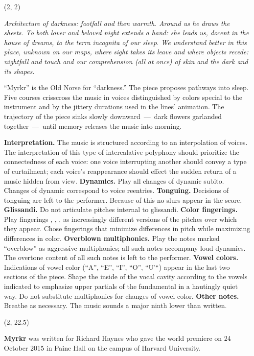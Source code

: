\documentclass[10pt]{article}
\begin{document}
\begin{textblock}{19}(2, 2)

\textit{Architecture of darkness: footfall and then warmth. Around us he draws
the sheets. To both lover and beloved night extends a hand: she leads us,
docent in the house of dreams, to the terra incognita of our sleep. We
understand better in this place, unknown on our maps, where sight takes its
leave and where objects recede: nightfall and touch and our comprehension (all
at once) of skin and the dark and its shapes.}

``Myrkr'' is the Old Norse for ``darkness.'' The piece proposes pathways into
sleep. Five courses crisscross the music in voices distinguished by colors
special to the instrument and by the jittery durations used in the lines'
animation. The trajectory of the piece sinks slowly downward~---~dark flowers
garlanded together~---~until memory releases the music into morning.

\textbf{Interpretation.} The music is structured according to an interpolation
of voices. The interpretation of this type of intercalative polyphony should
prioritize the connectedness of each voice: one voice interrupting another
should convey a type of curtailment; each voice's reappearance should effect
the sudden return of a music hidden from view. \textbf{Dynamics.} Play all
changes of dynamic subito. Changes of dynamic correspond to voice reentries.
\textbf{Tonguing.} Decisions of tonguing are left to the performer. Because of
this no slurs appear in the score. \textbf{Glissandi.} Do not articulate
pitches internal to glissandi. \textbf{Color fingerings.} Play fingerings
, , ,  as increasingly different
versions of the pitches over which they appear. Chose fingerings that minimize
differences in pitch while maximizing differences in color. \textbf{Overblown
multiphonics.} Play the notes marked ``overblow'' as aggressive multiphonics;
all such notes accompany loud dynamics. The overtone content of all such notes
is left to the performer. \textbf{Vowel colors.} Indications of vowel color
(``A'', ``E'', ``I'', ``O'', ``U'``) appear in the last two sections of the
piece. Shape the inside of the vocal cavity according to the vowels indicated
to emphasize upper partials of the fundamental in a hautingly quiet way. Do not
substitute multiphonics for changes of vowel color. \textbf{Other notes.}
Breathe as necessary. The music sounds a major ninth lower than written.

\end{textblock}

\begin{textblock}{19}(2, 22.5)

\textbf{Myrkr} was written for Richard Haynes who gave the world premiere on 24
October 2015 in Paine Hall on the campus of Harvard University.

\end{textblock}
\end{document}
